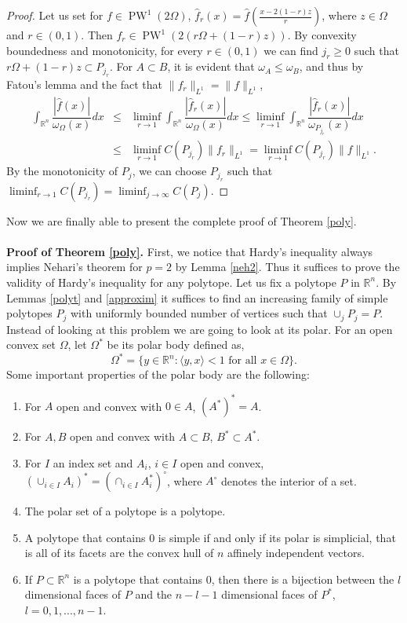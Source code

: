 \documentclass[footinclude=true]{amsart}
\theoremstyle{plain}
\DeclareMathOperator{\PW}{PW}
\begin{document}
\begin{proof}
	Let us set for $f\in\PW^1(2\Omega)$, $\widehat{f}_r(x)=\widehat{f}(\frac{x-2(1-r)z}{r})$, where $z\in \Omega$ and $r\in (0,1)$. Then $f_r\in \PW^1(2(r\Omega+(1-r)z))$. By convexity boundedness and monotonicity, for every $r\in (0,1)$ we can find $j_r\geq 0$ such that $r\Omega+(1-r)z\subset P_{j_r}$. For $A\subset B$, it is evident that $\omega_{A}\leq \omega_{B}$, and thus by Fatou's lemma and the fact that $\|f_r\|_{L^1}=\|f\|_{L^1}$,
	\begin{eqnarray} \int_{\mathbb{R}^{n}}\dfrac{|\widehat{f}(x)|}{\omega_{\Omega}(x)}dx&\leq&\liminf_{r\to 1}\int_{\mathbb{R}^{n}}\dfrac{|\widehat{f}_r(x)|}{\omega_{\Omega}(x)}dx\leq\liminf_{r\to 1}\int_{\mathbb{R}^{n}}\dfrac{|\widehat{f}_r(x)|}{\omega_{P_{j_r}}(x)}dx \nonumber \\ &\leq &\liminf_{r\to 1} C(P_{j_r})\|f_r\|_{L^1}= \liminf_{r\to 1} C(P_{j_r})\|f\|_{L^1}. \nonumber 
		\end{eqnarray} By the monotonicity of $P_j$, we can choose $P_{j_r}$ such that $\liminf_{r\to 1} C(P_{j_r})=\liminf_{j\to \infty} C(P_{j})$.
\end{proof}
	 Now we are finally able to present the complete proof of Theorem \ref{poly}. \\
	\\ \medspace 
	\textbf{Proof of Theorem \ref{poly}.} First, we notice that Hardy's inequality always implies Nehari's theorem for $p=2$ by Lemma \ref{neh2}. Thus it suffices to prove the validity of Hardy's inequality for any polytope. Let us fix a polytope $P$ in $\mathbb{R}^{n}$. By Lemmas \ref{polyt} and \ref{approxim} it suffices to find an increasing family of simple polytopes $P_j$ with uniformly bounded number of vertices such that $\cup_j P_j=P$. Instead of looking at this problem we are going to look at its polar. For an open convex set $\Omega$, let $\Omega^{\ast}$ be its polar body defined as, $$\Omega^{\ast}=\{y\in\mathbb{R}^{n}:\langle y,x\rangle < 1 \text{ for all }x\in \Omega\}.$$ Some important properties of the polar body are the following:
	\begin{enumerate}
		\item For $A$ open and convex with $0\in A$, $(A^{\ast})^{\ast}=A$.
		\item For $A,B$ open and convex with $A\subset B$, $B^{\ast}\subset A^{\ast}$.
		\item For $I$ an index set and $A_i$, $i\in I$ open and convex, $(\cup_{i\in I}A_i)^{\ast}=(\cap_{i\in I}A_i^{\ast})^{\circ}$, where $A^\circ$ denotes the interior of a set.
		\item The polar set of a polytope is a polytope.
		\item A polytope that contains $0$ is simple if and only if its polar is simplicial, that is all of its facets are the convex hull of $n$ affinely independent vectors. 
		\item If $P\subset\mathbb{R}^{n}$ is a polytope that contains $0$, then there is a bijection between the $l$ dimensional faces of $P$ and the $n-l-1$ dimensional faces of $P^{\ast}$, $l=0,1,...,n-1$.
	\end{enumerate} 
\end{document}

